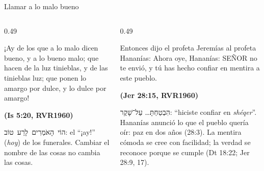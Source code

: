 \documentclass[hyperref={bookmarks=false},aspectratio=169]{beamer}
\newcommand{\heb}[1]{\mbox{\foreignlanguage{hebrew}{#1}}}
\newcommand{\SENOR}{S{\fontsize{0.78em}{1em}\selectfont EÑOR}}
\newcommand{\fuente}[1]{\par\hfill{\upshape\bfseries\footnotesize\textcolor{azul}{#1}}}
\begin{document}
\begin{frame}{Llamar a lo malo bueno}
\begin{columns}[t,onlytextwidth]
\begin{column}{0.49\textwidth}
\begin{cita}¡Ay de los que a lo malo dicen bueno, y a lo bueno malo; que hacen de la luz tinieblas, y de las tinieblas luz; que ponen lo amargo por dulce, y lo dulce por amargo!\fuente{(Is 5:20, RVR1960)}\end{cita}
\scriptsize\heb{הוֹי הָאֹמְרִים לָרַע טוֹב}: el ``¡ay!'' (\emph{hoy}) de los funerales. Cambiar el nombre de las cosas no cambia las cosas.
\end{column}
\begin{column}{0.49\textwidth}
\begin{cita}Entonces dijo el profeta Jeremías al profeta Hananías: Ahora oye, Hananías: \SENOR{} no te envió, y tú has hecho confiar en mentira a este pueblo.\fuente{(Jer 28:15, RVR1960)}\end{cita}
\scriptsize\heb{הִבְטַחְתָּ}\ldots{} \heb{עַל־שָׁקֶר}: ``hiciste confiar en \emph{shéqer}''. Hananías anunció lo que el pueblo quería oír: paz en dos años (28:3). La mentira cómoda se cree con facilidad; la verdad se reconoce porque se cumple (Dt 18:22; Jer 28:9, 17).
\end{column}
\end{columns}
\end{frame}
\end{document}
